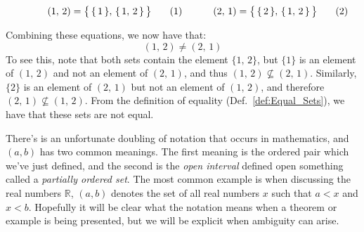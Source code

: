         \par
        \begin{subequations}
            \begin{minipage}[b]{0.49\textwidth}
                \begin{equation}
                    (1,\,2)=\big\{\,\{\,1\,\},\,\{\,1,\,2\,\}\,\big\}
                \end{equation}
            \end{minipage}
            \hfill
            \begin{minipage}[b]{0.49\textwidth}
                \begin{equation}
                    (2,\,1)=\big\{\,\{\,2\,\},\,\{\,1,\,2\,\}\,\big\}
                \end{equation}
            \end{minipage}
        \end{subequations}
        \par\vspace{2.5ex}
        Combining these equations, we now have that:
        \begin{equation}
            (1,\,2)\ne(2,\,1)
        \end{equation}
        To see this, note that both sets contain the element $\{1,\,2\}$, but
        $\{1\}$ is an element of $(1,\,2)$ and not an element of $(2,\,1)$,
        and thus $(1,\,2)\nsubseteq(2,\,1)$. Similarly, $\{2\}$ is an element
        of $(2,\,1)$ but not an element of $(1,\,2)$, and therefore
        $(2,\,1)\nsubseteq(1,\,2)$. From the definition of equality
        (Def.~\ref{def:Equal_Sets}), we have that these sets are not equal.
        \par\hfill\par
        There's is an unfortunate doubling of notation that occurs in
        mathematics, and $(a,b)$ has two common meanings. The first meaning is
        the ordered pair which we've just defined, and the second is the
        \textit{open interval} defined open something
        called a \textit{partially ordered set}.
        The most common example is when discussing the real numbers
        $\mathbb{R}$, $(a,b)$ denotes the set of all real numbers $x$ such that
        $a<x$ and $x<b$. Hopefully it will be clear what the notation means when
        a theorem or example is being presented, but we will be explicit when
        ambiguity can arise.
        \par\hfill\par
